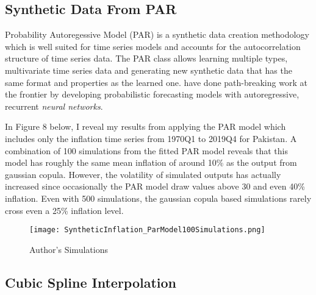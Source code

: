 \documentclass[12pt]{article}
\newcommand{\1}{\mathbbm 1}
\begin{document}
		\subsection{Synthetic Data From PAR}
		
		Probability Autoregessive Model (PAR) is a synthetic data creation methodology which is well suited for time series models and accounts for the autocorrelation structure of time series data. The PAR class allows learning multiple types, multivariate time series data and generating new synthetic data that has the same format and properties as the learned one. \cite{salinas2020deepar} have done path-breaking work at the frontier by developing probabilistic forecasting models with autoregressive, recurrent \textit{neural networks}.
		
		In Figure 8 below, I reveal my results from applying the PAR model which includes only the inflation time series from 1970Q1 to 2019Q4 for Pakistan. A combination of 100 simulations from the fitted PAR model reveals that this model has roughly the same mean inflation of around 10\% as the output from gaussian copula. However, the volatility of simulated outputs has actually increased since occasionally the PAR model draw values above 30 and even 40\% inflation. Even with 500 simulations, the gaussian copula based simulations rarely cross even a 25\% inflation level.
		
		
		
		\begin{figure}[H]
			\begin{Center}
				\texttt{[image: SyntheticInflation\_ParModel100Simulations.png]}
				\caption{Author's Simulations}
			\end{Center}
		\end{figure}
		
		
		
		
		\subsection{Cubic Spline Interpolation}
		
\end{document}
